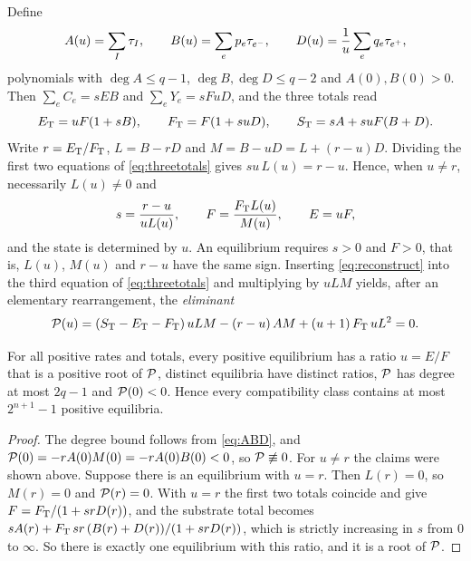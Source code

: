 Define
\begin{equation}\label{eq:ABD}
 A(u)=\sum_I\tau_I,\qquad B(u)=\sum_ep_e\tau_{e^{-}},\qquad
 D(u)=\frac1u\sum_eq_e\tau_{e^{+}},
\end{equation}
polynomials with \(\deg A\le q-1\), \(\deg B,\deg D\le q-2\) and \(A(0),B(0)>0\). Then
\(\sum_eC_e=sEB\) and \(\sum_eY_e=sFuD\), and the three totals read
\begin{equation}\label{eq:threetotals}
 E_{\mathrm T}=uF(1+sB),\qquad F_{\mathrm T}=F(1+suD),\qquad S_{\mathrm T}=sA+suF(B+D).
\end{equation}
Write \(r=E_{\mathrm T}/F_{\mathrm T}\), \(L=B-rD\) and \(M=B-uD=L+(r-u)D\). Dividing the first two equations of
\eqref{eq:threetotals} gives \(su\,L(u)=r-u\). Hence, when \(u\ne r\), necessarily
\(L(u)\ne0\) and
\begin{equation}\label{eq:reconstruct}
 s=\frac{r-u}{uL(u)},\qquad F=\frac{F_{\mathrm T} L(u)}{M(u)},\qquad E=uF ,
\end{equation}
and the state is determined by \(u\). An equilibrium requires \(s>0\) and \(F>0\), that is,
\(L(u)\), \(M(u)\) and \(r-u\) have the same sign. Inserting \eqref{eq:reconstruct} into the
third equation of \eqref{eq:threetotals} and multiplying by \(uLM\) yields, after an
elementary rearrangement, the \emph{eliminant}
\begin{equation}\label{eq:elim}
 \mathcal P(u)=(S_{\mathrm T}-E_{\mathrm T}-F_{\mathrm T})\,uLM-(r-u)\,AM+(u+1)\,F_{\mathrm T}\,uL^2=0 .
\end{equation}

\begin{proposition}\label{prop:count}
For all positive rates and totals, every positive equilibrium has a ratio \(u=E/F\) that is a
positive root of \(\mathcal P\), distinct equilibria have distinct ratios, \(\mathcal P\) has degree at most
\(2q-1\) and \(\mathcal P(0)<0\). Hence every compatibility class contains at most \(2^{n+1}-1\)
positive equilibria.
\end{proposition}
\begin{proof}
The degree bound follows from \eqref{eq:ABD}, and
\(\mathcal P(0)=-rA(0)M(0)=-rA(0)B(0)<0\), so \(\mathcal P\not\equiv0\). For \(u\ne r\) the claims were
shown above. Suppose there is an equilibrium with \(u=r\). Then \(L(r)=0\), so \(M(r)=0\) and
\(\mathcal P(r)=0\). With \(u=r\) the first two totals coincide and give \(F=F_{\mathrm T}/(1+srD(r))\), and
the substrate total becomes
\(sA(r)+F_{\mathrm T}\,sr\,(B(r)+D(r))/(1+srD(r))\), which is strictly increasing in \(s\) from \(0\) to
\(\infty\). So there is exactly one equilibrium with this ratio, and it is a root of \(\mathcal P\).
\end{proof}

